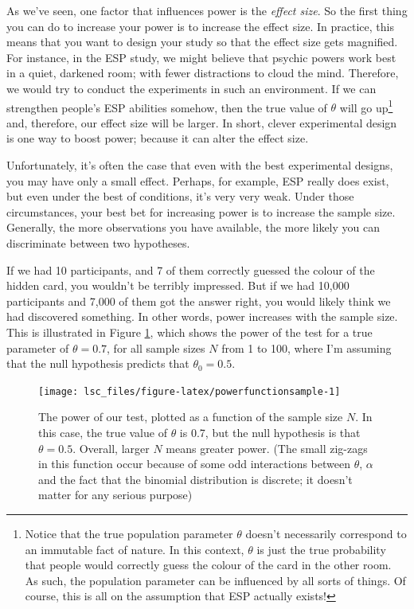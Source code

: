 \documentclass[
  11pt,
  a4paper,
  twoside,symmetric,openright]{book}
\theoremstyle{break}
\theoremstyle{break}
\begin{document}
As we've seen, one factor that influences power is the \emph{effect size}. So the first thing you can do to increase your power is to increase the effect size. In practice, this means that you want to design your study so that the effect size gets magnified. For instance, in the ESP study, we might believe that psychic powers work best in a quiet, darkened room; with fewer distractions to cloud the mind. Therefore, we would try to conduct the experiments in such an environment. If we can strengthen people's ESP abilities somehow, then the true value of \(\theta\) will go up\footnote{Notice that the true population parameter \(\theta\) doesn't necessarily correspond to an immutable fact of nature. In this context, \(\theta\) is just the true probability that people would correctly guess the colour of the card in the other room. As such, the population parameter can be influenced by all sorts of things. Of course, this is all on the assumption that ESP actually exists!} and, therefore, our effect size will be larger. In short, clever experimental design is one way to boost power; because it can alter the effect size.

Unfortunately, it's often the case that even with the best experimental designs, you may have only a small effect. Perhaps, for example, ESP really does exist, but even under the best of conditions, it's very very weak. Under those circumstances, your best bet for increasing power is to increase the sample size. Generally, the more observations you have available, the more likely you can discriminate between two hypotheses.

If we had 10 participants, and 7 of them correctly guessed the colour of the hidden card, you wouldn't be terribly impressed. But if we had 10,000 participants and 7,000 of them got the answer right, you would likely think we had discovered something. In other words, power increases with the sample size. This is illustrated in Figure \ref{fig:powerfunctionsample}, which shows the power of the test for a true parameter of \(\theta = 0.7\), for all sample sizes \(N\) from 1 to 100, where I'm assuming that the null hypothesis predicts that \(\theta_0 = 0.5\).

\begin{figure}

{\centering \texttt{[image: lsc\_files/figure-latex/powerfunctionsample-1]} 

}

\caption{The power of our test, plotted as a function of the sample size $N$. In this case, the true value of $\theta$ is 0.7, but the null hypothesis is that $\theta = 0.5$. Overall, larger $N$ means greater power. (The small zig-zags in this function occur because of some odd interactions between $\theta$, $\alpha$ and the fact that the binomial distribution is discrete; it doesn't matter for any serious purpose) }\label{fig:powerfunctionsample}
\end{figure}
\end{document}
